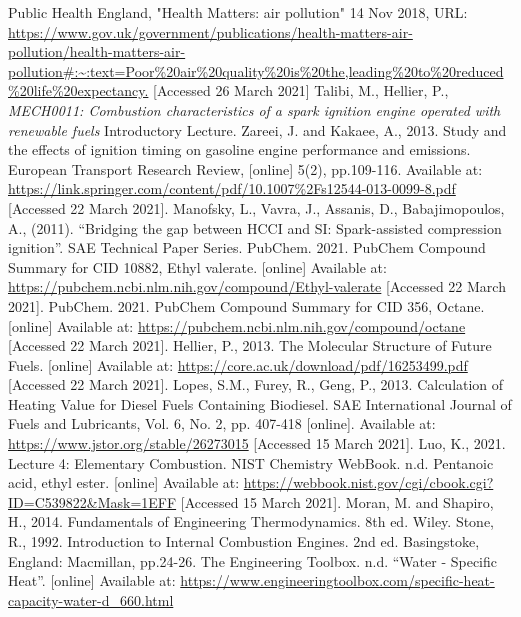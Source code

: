 \begin{thebibliography}{00}
     Public Health England, "Health Matters: air pollution" 14 Nov 2018, URL: \url{https://www.gov.uk/government/publications/health-matters-air-pollution/health-matters-air-pollution#:~:text=Poor%20air%20quality%20is%20the,leading%20to%20reduced%20life%20expectancy.} [Accessed 26 March 2021]
     Talibi, M., Hellier, P., \textit{MECH0011: Combustion characteristics of a spark ignition engine operated with renewable fuels} Introductory Lecture.
     Zareei, J. and Kakaee, A., 2013. Study and the effects of ignition timing on gasoline engine performance and emissions. European Transport Research Review, [online] 5(2), pp.109-116. Available at: \url{https://link.springer.com/content/pdf/10.1007\%2Fs12544-013-0099-8.pdf} [Accessed 22 March 2021].
     Manofsky, L., Vavra, J., Assanis, D., Babajimopoulos, A., (2011). ``Bridging the gap between HCCI and SI: Spark-assisted compression ignition''. SAE Technical Paper Series.
     PubChem. 2021. PubChem Compound Summary for CID 10882, Ethyl valerate. [online] Available at: \url{https://pubchem.ncbi.nlm.nih.gov/compound/Ethyl-valerate} [Accessed 22 March 2021].
     PubChem. 2021. PubChem Compound Summary for CID 356, Octane. [online] Available at: \url{https://pubchem.ncbi.nlm.nih.gov/compound/octane} [Accessed 22 March 2021].
     Hellier, P., 2013. The Molecular Structure of Future Fuels. [online] Available at: \url{https://core.ac.uk/download/pdf/16253499.pdf} [Accessed 22 March 2021].
     Lopes, S.M., Furey, R., Geng, P., 2013. Calculation of Heating Value for Diesel Fuels Containing Biodiesel. SAE International Journal of Fuels and Lubricants, Vol. 6, No. 2, pp. 407-418 [online]. Available at: \url{https://www.jstor.org/stable/26273015} [Accessed 15 March 2021].
     Luo, K., 2021. Lecture 4: Elementary Combustion.
     NIST Chemistry WebBook. n.d. Pentanoic acid, ethyl ester. [online] Available at: \url{https://webbook.nist.gov/cgi/cbook.cgi?ID=C539822&Mask=1EFF} [Accessed 15 March 2021].
     Moran, M. and Shapiro, H., 2014. Fundamentals of Engineering Thermodynamics. 8th ed. Wiley.
     Stone, R., 1992. Introduction to Internal Combustion Engines. 2nd ed. Basingstoke, England: Macmillan, pp.24-26.
    The Engineering Toolbox. n.d. ``Water - Specific Heat''. [online] Available at: \url{https://www.engineeringtoolbox.com/specific-heat-capacity-water-d_660.html}

\end{thebibliography}
